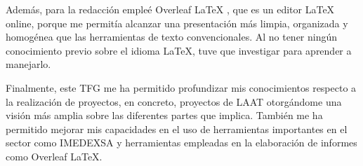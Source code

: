 Además, para la redacción empleé Overleaf LaTeX \cite{Overleaf_Learn}, que es un editor LaTeX online, porque me permitía alcanzar una presentación más limpia, organizada y homogénea que las herramientas de texto convencionales. Al no tener ningún conocimiento previo sobre el idioma LaTeX, tuve que investigar para aprender a manejarlo.

Finalmente, este TFG me ha permitido profundizar mis conocimientos respecto a la realización de proyectos, en concreto, proyectos de \ac{LAAT} otorgándome una visión más amplia sobre las diferentes partes que implica. También me ha permitido mejorar mis capacidades en el uso de herramientas importantes en el sector como IMEDEXSA y herramientas empleadas en la elaboración de informes como Overleaf LaTeX.